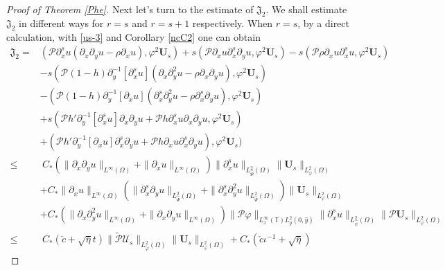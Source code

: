 \documentclass{amsart}
\numberwithin{equation}{section}
\begin{document}
\begin{proof}[Proof of Theorem \ref{Phe}]
Next let's turn to the estimate of $\mathfrak{J}_{2}$. We shall estimate $\mathfrak{J}_{2}$ in different ways for $r=s$ and $r=s+1$ respectively.
When $r=s$, by a direct calculation,  with \eqref{us-3} and Corollary \ref{ncC2} one can obtain
\begin{align}\label{JJ2(1)}
\mathfrak{J}_{2}
=& (\mathcal{P}\partial_{x}^{s}u(\partial_{x}\partial_{y}u-\rho\partial_{x}u),\varphi^{2}\mathbf{U}_{s})
  +s(\mathcal{P}\partial_{x}u\partial_{x}^{s}\partial_{y}u,\varphi^{2}\mathbf{U}_{s})
  -s(\mathcal{P}\rho\partial_{x}u\partial_{x}^{s}u,\varphi^{2}\mathbf{U}_{s})\\
 &-s(\mathcal{P}(1-h)\partial_{y}^{-1}[\partial_{x}^{s}u](\partial_{x}\partial_{y}^{2}u-\rho\partial_{x}\partial_{y}u),\varphi^{2}\mathbf{U}_{s})\nonumber\\
 &-(\mathcal{P}(1-h)\partial_{y}^{-1}[\partial_{x}u](\partial_{x}^{s}\partial_{y}^{2}u-\rho\partial_{x}^{s}\partial_{y}u),\varphi^{2}\mathbf{U}_{s})\nonumber\\
 &+s(\mathcal{P}h'\partial_{y}^{-1}[\partial_{x}^{s}u]\partial_{x}\partial_{y}u+\mathcal{P}h\partial_{x}^{s}u\partial_{x}\partial_{y}u,\varphi^{2}\mathbf{U}_{s})\nonumber\\
 &+(\mathcal{P}h'\partial_{y}^{-1}[\partial_{x}u]\partial_{x}^{s}\partial_{y}u+\mathcal{P}h\partial_{x}u\partial_{x}^{s}\partial_{y}u),\varphi^{2}\mathbf{U}_{s})\nonumber\\
\leq&~C_{*}\left(\|\partial_{x}\partial_{y}u\|_{L^{\infty}(\Omega)}+\|\partial_{x}u\|_{L^{\infty}(\Omega)}\right)
           \|\partial_{x}^{s}u\|_{L_{\hat{\Psi}}^{2}(\Omega)}\|\mathbf{U}_{s}\|_{L_{\varphi}^{2}(\Omega)}\nonumber\\
    &+C_{*}\|\partial_{x}u\|_{L^{\infty}(\Omega)}
           \left(\|\partial_{x}^{s}\partial_{y}u\|_{L_{\hat{\Psi}}^{2}(\Omega)}+\|\partial_{x}^{s}\partial_{y}^{2}u\|_{L_{\hat{\Psi}}^{2}(\Omega)}\right)
           \|\mathbf{U}_{s}\|_{L_{\varphi}^{2}(\Omega)}\nonumber\\
    &+C_{*}(\|\partial_{x}\partial_{y}^{2}u\|_{L^{\infty}(\Omega)}+\|\partial_{x}\partial_{y}u\|_{L^{\infty}(\Omega)})
           \|\mathcal{P}\varphi\|_{L_{x}^{\infty}(\mathbb{T})L_{y}^{2}(0,\hat{y})}\|\partial_{x}^{s}u\|_{L_{\hat{\psi}}^{2}(\Omega)}\|\mathcal{P}\mathbf{U}_{s}\|_{L_{\varphi}^{2}(\Omega)}\nonumber\\
\leq&~C_{*}(\check{c}+\sqrt{\bar{\eta}}t)
           \|\tilde{\mathcal{P}}\mathcal{U}_{s}\|_{L_{\tilde{\varphi}}^{2}(\Omega)}\|\mathbf{U}_{s}\|_{L_{\varphi}^{2}(\Omega)}
     +C_{*}(\check{c}\iota^{-1}+\sqrt{\bar{\eta}})

\end{align}
\end{proof}
\end{document}
